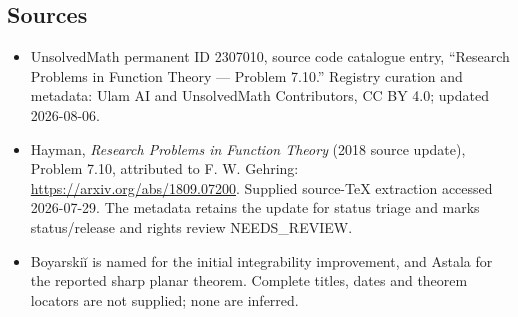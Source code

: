 \documentclass[11pt]{article}
\begin{document}
\subsection{Sources}
\begin{itemize}
\item UnsolvedMath permanent ID 2307010, source code catalogue entry, ``Research Problems in Function Theory --- Problem 7.10.'' Registry curation and metadata: Ulam AI and UnsolvedMath Contributors, CC BY 4.0; updated 2026-08-06.
\item Hayman, \emph{Research Problems in Function Theory} (2018 source update), Problem 7.10, attributed to F. W. Gehring: \url{https://arxiv.org/abs/1809.07200}. Supplied source-TeX extraction accessed 2026-07-29. The metadata retains the update for status triage and marks status/release and rights review NEEDS\_REVIEW.
\item Boyarskiĭ is named for the initial integrability improvement, and Astala for the reported sharp planar theorem. Complete titles, dates and theorem locators are not supplied; none are inferred.
\end{itemize}
\end{document}
